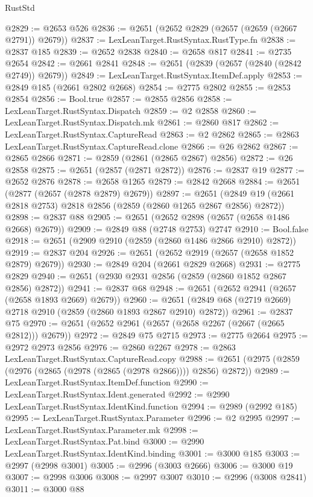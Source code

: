 \begin{lexlean}{RustStd}
\begin{coremodule}
@2829 := @2653 @526
@2836 := @2651 (@2652 @2829 (@2657 (@2659 (@2667 @2791)) @2679))
@2837 := LexLeanTarget.RustSyntax.RustType.fn
@2838 := @2837 @185
@2839 := @2652 @2838
@2840 := @2658 @817
@2841 := @2735 @2654
@2842 := @2661 @2841
@2848 := @2651 (@2839 (@2657 (@2840 (@2842 @2749)) @2679))
@2849 := LexLeanTarget.RustSyntax.ItemDef.apply
@2853 := @2849 @185 (@2661 @2802 @2668)
@2854 := @2775 @2802
@2855 := @2853 @2854
@2856 := Bool.true
@2857 := @2855 @2856
@2858 := LexLeanTarget.RustSyntax.Dispatch
@2859 := @2 @2858
@2860 := LexLeanTarget.RustSyntax.Dispatch.mk
@2861 := @2860 @817
@2862 := LexLeanTarget.RustSyntax.CaptureRead
@2863 := @2 @2862
@2865 := @2863 LexLeanTarget.RustSyntax.CaptureRead.clone
@2866 := @26 @2862
@2867 := @2865 @2866
@2871 := @2859 (@2861 (@2865 @2867) @2856)
@2872 := @26 @2858
@2875 := @2651 (@2857 (@2871 @2872))
@2876 := @2837 @19
@2877 := @2652 @2876
@2878 := @2658 @1265
@2879 := @2842 @2668
@2884 := @2651 (@2877 (@2657 (@2878 @2879) @2679))
@2897 := @2651 (@2849 @19 (@2661 @2818 @2753) @2818 @2856 (@2859 (@2860 @1265 @2867 @2856) @2872))
@2898 := @2837 @88
@2905 := @2651 (@2652 @2898 (@2657 (@2658 @1486 @2668) @2679))
@2909 := @2849 @88 (@2748 @2753) @2747
@2910 := Bool.false
@2918 := @2651 (@2909 @2910 (@2859 (@2860 @1486 @2866 @2910) @2872))
@2919 := @2837 @204
@2926 := @2651 (@2652 @2919 (@2657 (@2658 @1852 @2879) @2679))
@2930 := @2849 @204 (@2661 @2829 @2668)
@2931 := @2775 @2829
@2940 := @2651 (@2930 @2931 @2856 (@2859 (@2860 @1852 @2867 @2856) @2872))
@2941 := @2837 @68
@2948 := @2651 (@2652 @2941 (@2657 (@2658 @1893 @2669) @2679))
@2960 := @2651 (@2849 @68 (@2719 @2669) @2718 @2910 (@2859 (@2860 @1893 @2867 @2910) @2872))
@2961 := @2837 @75
@2970 := @2651 (@2652 @2961 (@2657 (@2658 @2267 (@2667 (@2665 @2812))) @2679))
@2972 := @2849 @75 @2715
@2973 := @2775 @2664
@2975 := @2972 @2973 @2856
@2976 := @2860 @2267
@2978 := @2863 LexLeanTarget.RustSyntax.CaptureRead.copy
@2988 := @2651 (@2975 (@2859 (@2976 (@2865 (@2978 (@2865 (@2978 @2866)))) @2856) @2872))
@2989 := LexLeanTarget.RustSyntax.ItemDef.function
@2990 := LexLeanTarget.RustSyntax.Ident.generated
@2992 := @2990 LexLeanTarget.RustSyntax.IdentKind.function
@2994 := @2989 (@2992 @185)
@2995 := LexLeanTarget.RustSyntax.Parameter
@2996 := @2 @2995
@2997 := LexLeanTarget.RustSyntax.Parameter.mk
@2998 := LexLeanTarget.RustSyntax.Pat.bind
@3000 := @2990 LexLeanTarget.RustSyntax.IdentKind.binding
@3001 := @3000 @185
@3003 := @2997 (@2998 @3001)
@3005 := @2996 (@3003 @2666)
@3006 := @3000 @19
@3007 := @2998 @3006
@3008 := @2997 @3007
@3010 := @2996 (@3008 @2841)
@3011 := @3000 @88

\end{coremodule}
\end{lexlean}
